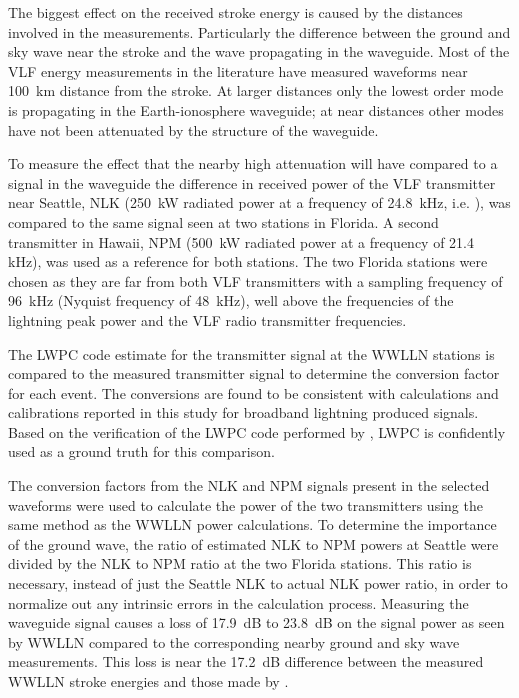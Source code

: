 The biggest effect on the received stroke energy is caused by the distances involved in the measurements.
Particularly the difference between the ground and sky wave near the stroke and the wave propagating in the waveguide.
Most of the VLF energy measurements in the literature have measured waveforms near 100~km distance from the stroke.
At larger distances only the lowest order mode is propagating in the Earth-ionosphere waveguide; at near distances other modes have not been attenuated by the structure of the waveguide.

To measure the effect that the nearby high attenuation will have compared to a signal in the waveguide the difference in received power of the VLF transmitter near Seattle, NLK (250~kW radiated power at a frequency of 24.8~kHz, i.e. \citet{Clilverd2009}), was compared to the same signal seen at two stations in Florida.
A second transmitter in Hawaii, NPM (500~kW radiated power at a frequency of 21.4 kHz), was used as a reference for both stations.
The two Florida stations were chosen as they are far from both VLF transmitters with a sampling frequency of 96~kHz (Nyquist frequency of 48~kHz), well above the frequencies of the lightning peak power and the VLF radio transmitter frequencies.

The LWPC code estimate for the transmitter signal at the WWLLN stations is compared to the measured transmitter signal to determine the conversion factor for each event.
The conversions are found to be consistent with calculations and calibrations reported in this study for broadband lightning produced signals.
Based on the verification of the LWPC code performed by \citet{Thomson2010}, LWPC is confidently used as a ground truth for this comparison.

The conversion factors from the NLK and NPM signals present in the selected waveforms were used to calculate the power of the two transmitters using the same method as the WWLLN power calculations.
To determine the importance of the ground wave, the ratio of estimated NLK to NPM powers at Seattle were divided by the NLK to NPM ratio at the two Florida stations.
This ratio is necessary, instead of just the Seattle NLK to actual NLK power ratio, in order to normalize out any intrinsic errors in the calculation process.
Measuring the waveguide signal causes a loss of 17.9~dB to 23.8~dB on the signal power as seen by WWLLN compared to the corresponding nearby ground and sky wave measurements.
This loss is near the 17.2~dB difference between the measured WWLLN stroke energies and those made by \citet{Taylor1963}.

